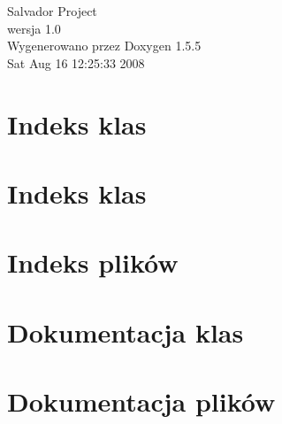 \documentclass[a4paper]{book}
\begin{document}
\begin{titlepage}
\vspace*{7cm}
\begin{center}
{\Large Salvador Project \\[1ex]\large wersja 1.0 }\\
\vspace*{1cm}
{\large Wygenerowano przez Doxygen 1.5.5}\\
\vspace*{0.5cm}
{\small Sat Aug 16 12:25:33 2008}\\
\end{center}
\end{titlepage}
\clearemptydoublepage
{}
\tableofcontents
\clearemptydoublepage
{}
\chapter{Indeks klas}

\chapter{Indeks klas}

\chapter{Indeks plików}

\chapter{Dokumentacja klas}






\chapter{Dokumentacja plików}
















\printindex
\end{document}
